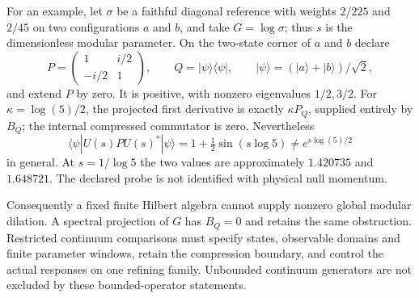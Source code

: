 \documentclass[11pt]{article}
\begin{document}
For an example, let $\sigma$ be a faithful diagonal reference with weights
$2/225$ and $2/45$ on two configurations $a$ and $b$, and take
$G=\log\sigma$; thus $s$ is the dimensionless modular parameter. On the
two-state corner of $a$ and $b$ declare
\[
 P=\begin{pmatrix}1&i/2\\-i/2&1\end{pmatrix},\qquad
 Q=|\psi\rangle\langle\psi|,\qquad
 |\psi\rangle=(|a\rangle+|b\rangle)/\sqrt2,
\]
and extend $P$ by zero. It is positive, with nonzero eigenvalues
$1/2,3/2$. For $\kappa=\log(5)/2$, the projected first derivative
is exactly $\kappa P_Q$, supplied entirely by $B_Q$; the internal
compressed commutator is zero. Nevertheless
\[
 \langle\psi|U(s)PU(s)^*|\psi\rangle
 =1+\tfrac12\sin(s\log5)\ne e^{s\log(5)/2}
\]
in general. At $s=1/\log5$ the two values are approximately $1.420735$
and $1.648721$. The declared probe is not identified with physical null
momentum.

Consequently a fixed finite Hilbert algebra cannot supply nonzero
global modular dilation. A spectral projection of $G$ has $B_Q=0$ and
retains the same obstruction. Restricted continuum comparisons must
specify states, observable domains and finite parameter windows, retain
the compression boundary, and control the actual responses on one
refining family. Unbounded continuum generators are not excluded by
these bounded-operator statements.
\end{document}
